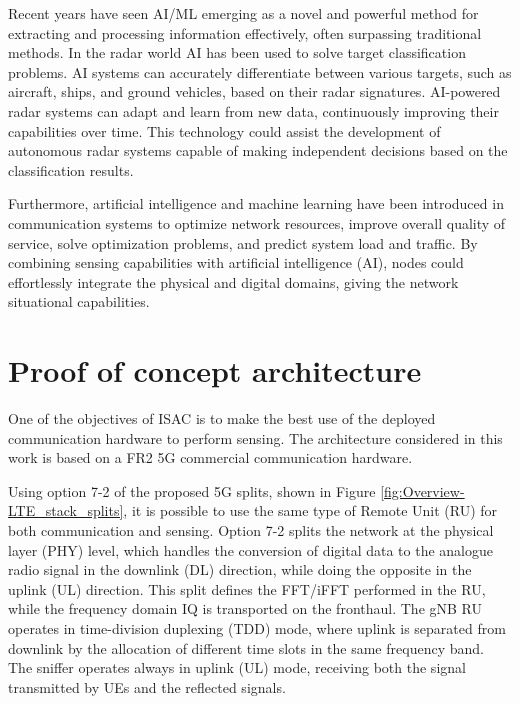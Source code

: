 	Recent years have seen AI/ML emerging as a novel and powerful method for extracting and processing information effectively, often surpassing traditional methods.
	In the radar world AI has been used to solve target classification problems. 
	AI systems can accurately differentiate between various targets, such as aircraft, ships, and ground vehicles, based on their radar signatures. 
	AI-powered radar systems can adapt and learn from new data, continuously improving their capabilities over time. 
	This technology could assist the development of autonomous radar systems capable of making independent decisions based on the classification results. 
	
	 Furthermore, artificial intelligence and machine learning have been introduced in communication systems to optimize network resources, improve overall quality of service, solve optimization problems, and predict system load and traffic. 
	 By combining sensing capabilities with artificial intelligence (AI), nodes could effortlessly integrate the physical and digital domains, giving the network situational capabilities.
	


\section{Proof of concept architecture}
	\label{sec:intro-PoCarchitecture}
	
	One of the objectives of ISAC is to make the best use of the deployed communication hardware to perform sensing. 
	The architecture considered in this work is based on a FR2 5G commercial communication hardware.
	
	Using option 7-2 of the proposed 5G splits, shown in Figure \ref{fig:Overview-LTE_stack_splits}, it is possible to use the same type of Remote Unit (RU) for both communication and sensing.
	Option 7-2 splits the network at the physical layer (PHY) level, which handles the conversion of digital data to the analogue radio signal in the downlink (DL) direction, while doing the opposite in the uplink (UL) direction.
	This split defines the FFT/iFFT performed in the RU, while the frequency domain IQ is transported on the fronthaul.
	The gNB RU operates in time-division duplexing (TDD) mode, where uplink is separated from downlink by the allocation of different time slots in the same frequency band. 	
	The sniffer operates always in uplink (UL) mode, receiving both the signal transmitted by UEs and the reflected signals. 
	
